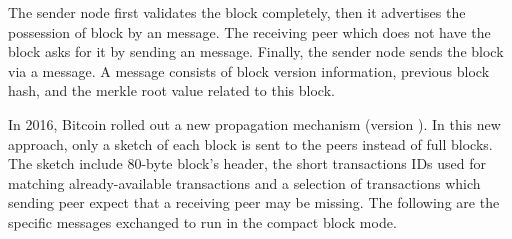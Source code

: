  The sender node first validates the block completely, then it advertises the possession of block by an  message. The receiving peer which does not have the block asks for it by sending an  message. Finally, the sender node sends the block via a  message. 
A  message  consists of block version information, previous block hash, and the  merkle root value  related to this block. 

In  2016, Bitcoin rolled out a new propagation mechanism (version ). In this new approach, only a sketch of each block is sent to the peers instead of full blocks. The sketch include 80-byte block's header, the short transactions IDs used for matching already-available transactions and a selection of transactions which sending peer expect that a receiving peer may be missing.%
The following are the specific messages exchanged to run \bc in the compact block mode. 

